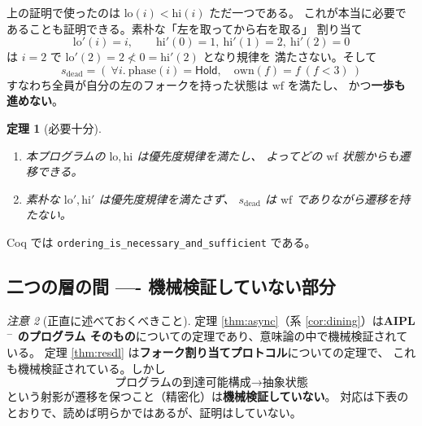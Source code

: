\documentclass[11pt,a4paper]{ltjsarticle}
\newtheorem{theorem}{定理}
\theoremstyle{definition}
\theoremstyle{remark}
\newtheorem{remark}[theorem]{注意}
\begin{document}
上の証明で使ったのは $\mathrm{lo}(i) < \mathrm{hi}(i)$ ただ一つである。
これが本当に必要であることも証明できる。素朴な「左を取ってから右を取る」
割り当て
\[
\mathrm{lo}'(i) = i, \qquad
\mathrm{hi}'(0) = 1,\ \mathrm{hi}'(1) = 2,\ \mathrm{hi}'(2) = 0
\]
は $i = 2$ で $\mathrm{lo}'(2) = 2 \not< 0 = \mathrm{hi}'(2)$ となり規律を
満たさない。そして
\[
s_{\mathrm{dead}} = (\ \forall i.\ \mathrm{phase}(i) = \textsf{Hold},\quad
                       \mathrm{own}(f) = f\ (f < 3)\ )
\]
すなわち全員が自分の左のフォークを持った状態は $\mathrm{wf}$ を満たし、
かつ\textbf{一歩も進めない}。

\begin{theorem}[必要十分]
\label{thm:nands}
\begin{enumerate}
\item 本プログラムの $\mathrm{lo}, \mathrm{hi}$ は優先度規律を満たし、
      よってどの $\mathrm{wf}$ 状態からも遷移できる。
\item 素朴な $\mathrm{lo}', \mathrm{hi}'$ は優先度規律を満たさず、
      $s_{\mathrm{dead}}$ は $\mathrm{wf}$ でありながら遷移を持たない。
\end{enumerate}
\end{theorem}

Coq では \verb|ordering_is_necessary_and_sufficient| である。

\subsection{二つの層の間 ---- 機械検証していない部分}

\begin{remark}[正直に述べておくべきこと]
定理 \ref{thm:async}（系 \ref{cor:dining}）は\textbf{AIPL$^-$ のプログラム
そのもの}についての定理であり、意味論の中で機械検証されている。
定理 \ref{thm:resdl} は\textbf{フォーク割り当てプロトコル}についての定理で、
これも機械検証されている。しかし
\[
\text{プログラムの到達可能構成} \longrightarrow \text{抽象状態}
\]
という射影が遷移を保つこと（精密化）は\textbf{機械検証していない}。
対応は下表のとおりで、読めば明らかではあるが、証明はしていない。
\end{remark}
\end{document}
